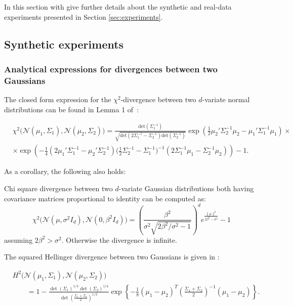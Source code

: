 In this section with give further details about the synthetic and real-data experiments presented in Section \ref{sec:experiments}.

\subsection{Synthetic experiments}



\subsubsection{Analytical expressions for divergences between two Gaussians}\label{appendix:toy-exps}

The closed form expression for the $\chi^2$-divergence between two $d$-variate normal distributions can be found in Lemma 1 of~\cite{NielsenN14}:
\begin{lemma}\label{lemma:chi-squared-closed-form}
\begin{align*}
&\chi^2\bigl( \mathcal{N}(\mu_1, \Sigma_1), 
\mathcal{N}(\mu_2, \Sigma_2)\bigr)
=
\frac{\mathrm{det}(\Sigma_1^{-1})}{\sqrt{\mathrm{det}(2\Sigma_1^{-1} - \Sigma_2^{-1})\mathrm{det}(\Sigma_2^{-1})}}
\exp\left(
\frac12\mu_2'\Sigma_2^{-1}\mu_2 
-\mu_1'\Sigma_1^{-1}\mu_1 
\right)
\times\\
&\times\exp\left(
-\frac14(2\mu_1' \Sigma_1^{-1} - \mu_2' \Sigma_2^{-1})
\bigl(\frac12 \Sigma_2^{-1} - \Sigma_1^{-1}\bigr)^{-1}
(2\Sigma_1^{-1}\mu_1 - \Sigma_2^{-1}\mu_2)
\right) - 1.
\end{align*}
\end{lemma}
As a corollary, the following also holds:
\begin{corollary}
Chi square divergence between two $d$-variate Gaussian distributions both having covariance matrices proportional to identity can be computed as:
\[
\chi^2\bigl( \mathcal{N}(\mu, \sigma^2 I_d), \mathcal{N}(0, \beta^2 I_d)\bigr)
=
\left(\frac{\beta^2}{\sigma^2\sqrt{2\beta^2/\sigma^2 - 1}}\right)^d
e^{\frac{\|\mu\|^2}{2\beta^2 - \sigma^2}}
- 1
\]
assuming $2\beta^{2} > \sigma^{2}$. 
Otherwise the divergence is infinite.
\end{corollary}

The squared Hellinger divergence between two Gaussians is given in \cite{pardo2005statistical}:

\begin{lemma}
\begin{align*}
&H^2\bigl( \mathcal{N}(\mu_1, \Sigma_1), 
\mathcal{N}(\mu_2, \Sigma_2)\bigr) \\
&\qquad = 1 - \frac{ \det (\Sigma_1)^{1/4} \det (\Sigma_2) ^{1/4}} { \det \left( \frac{\Sigma_1 + \Sigma_2}{2}\right)^{1/2} }
              \exp\left\{-\frac{1}{8}(\mu_1 - \mu_2)^T 
              \left(\frac{\Sigma_1 + \Sigma_2}{2}\right)^{-1}
              (\mu_1 - \mu_2)              
              \right\}.
\end{align*}
\end{lemma}

